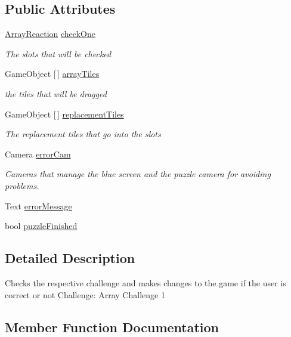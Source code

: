 \subsection*{Public Attributes}
\begin{DoxyCompactItemize}
\item 
\hyperlink{class_array_reaction}{Array\+Reaction} \hyperlink{class_array_access_completion_a5b7d8357b6c82703f06eaabee00d0f2f}{check\+One}
\begin{DoxyCompactList}\small\item\em The slots that will be checked \end{DoxyCompactList}\item 
Game\+Object \mbox{[}$\,$\mbox{]} \hyperlink{class_array_access_completion_ae8c88b6f2dd0fe851c866097911df8e4}{array\+Tiles}
\begin{DoxyCompactList}\small\item\em the tiles that will be dragged \end{DoxyCompactList}\item 
Game\+Object \mbox{[}$\,$\mbox{]} \hyperlink{class_array_access_completion_a97c6ec1f65786273d1186f23ce5b0f6c}{replacement\+Tiles}
\begin{DoxyCompactList}\small\item\em The replacement tiles that go into the slots \end{DoxyCompactList}\item 
Camera \hyperlink{class_array_access_completion_a0e0e013df2a9203aa27344b6090a56aa}{error\+Cam}
\begin{DoxyCompactList}\small\item\em Cameras that manage the blue screen and the puzzle camera for avoiding problems. \end{DoxyCompactList}\item 
Text \hyperlink{class_array_access_completion_a03988dc3e4e687e24f0c2c57d75a03b0}{error\+Message}
\item 
bool \hyperlink{class_array_access_completion_a1cddf9521f110a2868afa36514c9dcb4}{puzzle\+Finished}
\end{DoxyCompactItemize}


\subsection{Detailed Description}
Checks the respective challenge and makes changes to the game if the user is correct or not Challenge\+: Array Challenge 1 

\subsection{Member Function Documentation}
\mbox{\label{class_array_access_completion_a16f52bce4f85c9dc5e6f751531988bb0}} 
